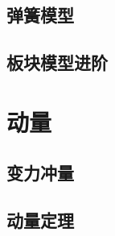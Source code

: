 \documentclass[cn,blue,11pt,normal]{elegantnote}
\begin{document}
\subsection{弹簧模型}
\begin{proset}
	
\end{proset}
\begin{proset}
	
\end{proset}
\begin{proset}
	
\end{proset}
\begin{proset}
	
\end{proset}
\subsection{板块模型进阶}
\begin{proset}
	
\end{proset}
\begin{proset}
	
\end{proset}
\begin{proset}
	
\end{proset}
\begin{proset}
	
\end{proset}
\begin{proset}
	
\end{proset}

\newpage
\section{动量}




\begin{proset}
	
\end{proset}
\subsection{变力冲量}
\begin{proset}
	
\end{proset}
\subsection{动量定理}
\end{document}
